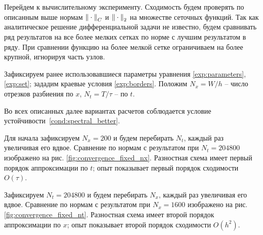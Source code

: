 Перейдем к вычислительному эксперименту. Сходимость будем проверять по описанным выше нормам ${\| \cdot \|}_C$ и ${\| \cdot \|}_2$ на множестве сеточных функций. Так как аналитическое решение дифференциальной задачи не известно, будем сравнивать ряд результатов на все более мелких сетках по норме с лучшим результатом в ряду. При сравнении функцию на более мелкой сетке ограничиваем на более крупной, игнорируя часть узлов.

Зафиксируем ранее использовавшиеся параметры уравнения \eqref{exp:parameters}, \eqref{exp:set}; зададим краевые условия \eqref{exp:borders}. Положим $N_x = W / h$ -- число отрезков разбиения по $x$, $N_t = T / \tau$ -- по $t$.

Во всех описанных далее вариантах расчетов соблюдается условие устойчивости~\eqref{cond:spectral_better}.

Для начала зафиксируем $N_x = 200$ и будем перебирать $N_t$, каждый раз увеличивая его вдвое. Сравнение по нормам с результатом при $N_t = 204800$ изображено на рис. \ref{fig:convergence_fixed_nx}. Разностная схема имеет первый порядок аппроксимации по $t$; опыт показывает первый порядок сходимости $O(\tau)$.

Зафиксируем $N_t = 204800$ и будем перебирать $N_x$, каждый раз увеличивая его вдвое. Сравнение по нормам с результатом при $N_x = 1600$ изображено на рис. \ref{fig:convergence_fixed_nt}. Разностная схема имеет второй порядок аппроксимации по $x$; опыт показывает второй порядок сходимости $O(h^2)$.

